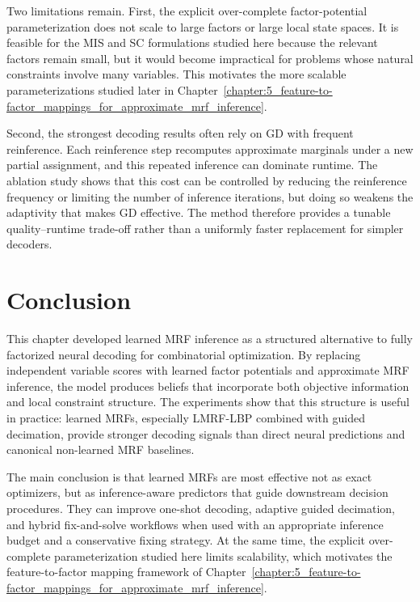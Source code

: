 Two limitations remain. First, the explicit over-complete factor-potential parameterization does not scale to large factors or large local state spaces. It is feasible for the MIS and SC formulations studied here because the relevant factors remain small, but it would become impractical for problems whose natural constraints involve many variables. This motivates the more scalable parameterizations studied later in Chapter~\ref{chapter:5_feature-to-factor_mappings_for_approximate_mrf_inference}.

Second, the strongest decoding results often rely on GD with frequent reinference. Each reinference step recomputes approximate marginals under a new partial assignment, and this repeated inference can dominate runtime. The ablation study shows that this cost can be controlled by reducing the reinference frequency or limiting the number of inference iterations, but doing so weakens the adaptivity that makes GD effective. The method therefore provides a tunable quality--runtime trade-off rather than a uniformly faster replacement for simpler decoders.

\section{Conclusion}

This chapter developed learned MRF inference as a structured alternative to fully factorized neural decoding for combinatorial optimization. By replacing independent variable scores with learned factor potentials and approximate MRF inference, the model produces beliefs that incorporate both objective information and local constraint structure. The experiments show that this structure is useful in practice: learned MRFs, especially LMRF-LBP combined with guided decimation, provide stronger decoding signals than direct neural predictions and canonical non-learned MRF baselines.

The main conclusion is that learned MRFs are most effective not as exact optimizers, but as inference-aware predictors that guide downstream decision procedures. They can improve one-shot decoding, adaptive guided decimation, and hybrid fix-and-solve workflows when used with an appropriate inference budget and a conservative fixing strategy. At the same time, the explicit over-complete parameterization studied here limits scalability, which motivates the feature-to-factor mapping framework of Chapter~\ref{chapter:5_feature-to-factor_mappings_for_approximate_mrf_inference}.

